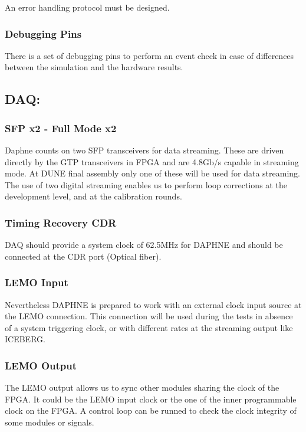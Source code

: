 An error handling protocol must be designed.

\subsubsection{Debugging Pins}
There is a set of debugging pins to perform an event check in case of differences between the simulation and the hardware results.

\subsection{DAQ:}

\subsubsection{SFP x2 - Full Mode x2}
Daphne counts on two SFP transceivers for data streaming. These are driven directly by the GTP transceivers in FPGA and are 4.8Gb/s capable in streaming mode. At DUNE final assembly only one of these will be used for data streaming. The use of two digital streaming enables us to perform loop corrections at the development level, and at the calibration rounds. 

\subsubsection{Timing Recovery CDR}
DAQ should provide a system clock of 62.5MHz for DAPHNE and should be connected at the CDR port (Optical fiber). 

\subsubsection{LEMO Input}
Nevertheless DAPHNE is prepared to work with an external clock input source at the LEMO connection. This connection will be used during the tests in absence of a system triggering clock, or with different rates at the streaming output like ICEBERG. 

\subsubsection{LEMO Output}
The LEMO output allows us to sync other modules sharing the clock of the FPGA. It could be the LEMO input clock or the one of the inner programmable clock on the FPGA. A control loop can be runned to check the clock integrity of some modules or signals.


